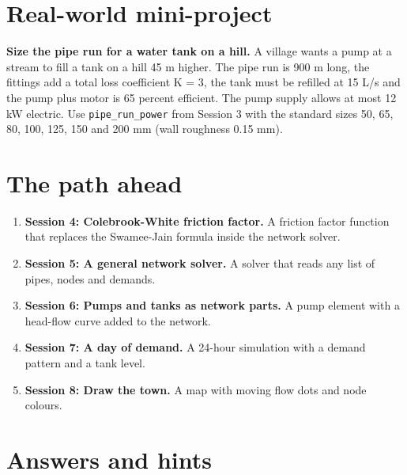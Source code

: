 \documentclass[11pt,a4paper]{article}
\begin{document}
\section{Real-world mini-project}
\textbf{Size the pipe run for a water tank on a hill.} A village wants a pump at a stream to fill a tank on a hill 45 m higher. The pipe run is 900 m long, the fittings add a total loss coefficient K = 3, the tank must be refilled at 15 L/s and the pump plus motor is 65 percent efficient. The pump supply allows at most 12 kW electric. Use \texttt{pipe\_run\_power} from Session 3 with the standard sizes 50, 65, 80, 100, 125, 150 and 200 mm (wall roughness 0.15 mm).

\section{The path ahead}
\begin{enumerate}[nosep]
\item \textbf{Session 4: Colebrook-White friction factor.} A friction factor function that replaces the Swamee-Jain formula inside the network solver.
\item \textbf{Session 5: A general network solver.} A solver that reads any list of pipes, nodes and demands.
\item \textbf{Session 6: Pumps and tanks as network parts.} A pump element with a head-flow curve added to the network.
\item \textbf{Session 7: A day of demand.} A 24-hour simulation with a demand pattern and a tank level.
\item \textbf{Session 8: Draw the town.} A map with moving flow dots and node colours.
\end{enumerate}

\section{Answers and hints}
\end{document}
